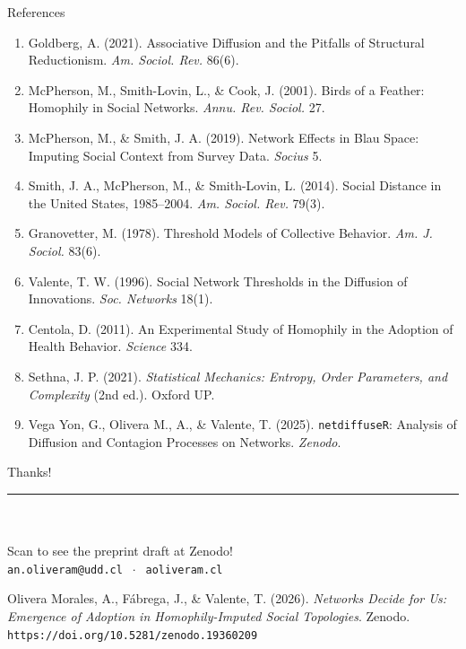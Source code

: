 \documentclass[aspectratio=169,11pt]{beamer}
\begin{document}
\begin{frame}{References}
\footnotesize
\begin{enumerate}\itemsep1.3pt
  \item Goldberg, A. (2021). Associative Diffusion and the Pitfalls of Structural Reductionism. \emph{Am. Sociol. Rev.} 86(6).
  \item McPherson, M., Smith-Lovin, L., \& Cook, J. (2001). Birds of a Feather: Homophily in Social Networks. \emph{Annu. Rev. Sociol.} 27.
  \item McPherson, M., \& Smith, J. A. (2019). Network Effects in Blau Space: Imputing Social Context from Survey Data. \emph{Socius} 5.
  \item Smith, J. A., McPherson, M., \& Smith-Lovin, L. (2014). Social Distance in the United States, 1985--2004. \emph{Am. Sociol. Rev.} 79(3).
  \item Granovetter, M. (1978). Threshold Models of Collective Behavior. \emph{Am. J. Sociol.} 83(6).
  \item Valente, T. W. (1996). Social Network Thresholds in the Diffusion of Innovations. \emph{Soc. Networks} 18(1).
  \item Centola, D. (2011). An Experimental Study of Homophily in the Adoption of Health Behavior. \emph{Science} 334.
  \item Sethna, J. P. (2021). \emph{Statistical Mechanics: Entropy, Order Parameters, and Complexity} (2nd ed.). Oxford UP.
  \item Vega Yon, G., Olivera M., A., \& Valente, T. (2025). \texttt{netdiffuseR}: Analysis of Diffusion and Contagion Processes on Networks. \emph{Zenodo}.
\end{enumerate}
\end{frame}

\begin{frame}[plain]
  \vfill
  \begin{center}
    {\Large Thanks!}\\[2pt]
    {\color{ndred}\rule{0.30\textwidth}{1.1pt}}\\[0.7cm]
    \\[0.3cm]
    {\small Scan to see the preprint draft at Zenodo!}\\[5pt]
    {\texttt{an.oliveram@udd.cl} $\;\cdot\;$ \texttt{aoliveram.cl}}\\[7pt]
    \vspace{0.3cm}
    \parbox{0.82\textwidth}{\centering\scriptsize\color{ndgray}
      Olivera Morales, A., Fábrega, J., \& Valente, T. (2026). \emph{Networks Decide for Us:
      Emergence of Adoption in Homophily-Imputed Social Topologies}. Zenodo.
      \texttt{https://doi.org/10.5281/zenodo.19360209}}
  \end{center}
  \vfill
\end{frame}
\end{document}
